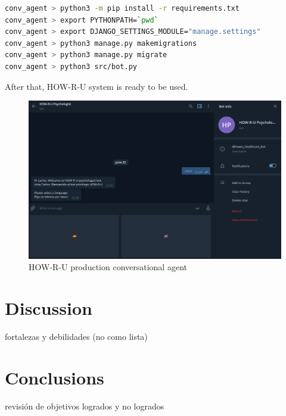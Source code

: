 \documentclass[12pt,english]{article}
\begin{document}
\begin{lstlisting}[mathescape=false, language=bash]
conv_agent > python3 -m pip install -r requirements.txt
conv_agent > export PYTHONPATH=`pwd`
conv_agent > export DJANGO_SETTINGS_MODULE="manage.settings"
conv_agent > python3 manage.py makemigrations
conv_agent > python3 manage.py migrate
conv_agent > python3 src/bot.py
\end{lstlisting}

After that, HOW-R-U system is ready to be used.

\begin{figure}[H]
  \centering
    \includegraphics[width=\textwidth]{production.png}
    \caption{HOW-R-U production conversational agent}
\end{figure}


\section{Discussion}
fortalezas y debilidades (no como lista)

\section{Conclusions}
revisión de objetivos logrados y no logrados

\newpage


\doclicenseThis
\end{document}
